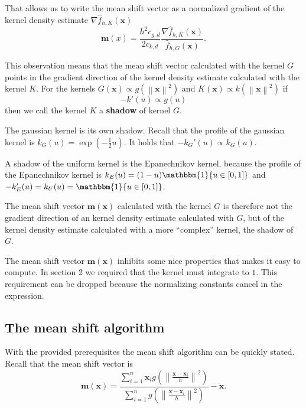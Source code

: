 \documentclass{article}
\newcommand{\norm}[1]{\left\lVert#1\right\rVert}
\begin{document}
That allows us to write the mean shift vector as a normalized gradient of the kernel density estimate $\nabla \hat{f}_{h,K}(\bm{x})$
\begin{equation}
	\bm{m}(x) = \frac{h^2c_{g,d}}{2c_{k,d}} \frac{\nabla \hat{f}_{h,K}(\bm{x})}{\hat{f}_{h,G}(\bm{x})}\text{.}
\end{equation}

This observation means that the mean shift vector calculated with the kernel $G$ points in the gradient direction of the kernel density estimate calculated with the kernel $K$. For the kernels $G(\bm{x}) \propto g(\norm{\bm{x}}^2)$ and $K(\bm{x}) \propto k(\norm{\bm{x}}^2)$ if
\begin{equation}
	-k'(u) \propto g(u)
	\label{equ:shadow-relation}
\end{equation}
then we call the kernel $K$ a \textbf{shadow} of kernel $G$.

The gaussian kernel is its own shadow. Recall that the profile of the gaussian kernel is $k_G(u) = \exp\left(-\frac{1}{2}u\right)$. It holds that $-k_G'(u) \propto k_G(u)$.

A shadow of the uniform kernel is the Epanechnikov kernel, because the profile of the Epanechnikov kernel is $k_E(u) = (1 - u) \mathbbm{1}\{u \in [0, 1]\}$ and $-k_E'(u) = k_U(u) = \mathbbm{1}\{u \in [0, 1]\}$.

The mean shift vector $\bm{m}(\bm{x})$ calculated with the kernel $G$ is therefore not the gradient direction of an kernel density estimate calculated with $G$, but of the kernel density estimate calculated with a more ``complex'' kernel, the shadow of $G$.

The mean shift vector $\bm{m}(\bm{x})$ inhibits some nice properties that makes it easy to compute. In section 2 we required that the kernel must integrate to $1$. This requirement can be dropped because the normalizing constants cancel in the expression.



\subsection{The mean shift algorithm} \label{sec:mean-shift-algorithm}

With the provided prerequisites the mean shift algorithm can be quickly stated. Recall that the mean shift vector is
\begin{equation}
\bm{m}(\bm{x}) = \frac{\sum_{i=1}^n \bm{x}_i g\left(\norm{\frac{\bm{x} - \bm{x}_i}{h}}^2 \right)}{\sum_{i=1}^n g\left(\norm{\frac{\bm{x} - \bm{x}_i}{h}}^2 \right)} - \bm{x}\text{.}
\end{equation}
\end{document}
